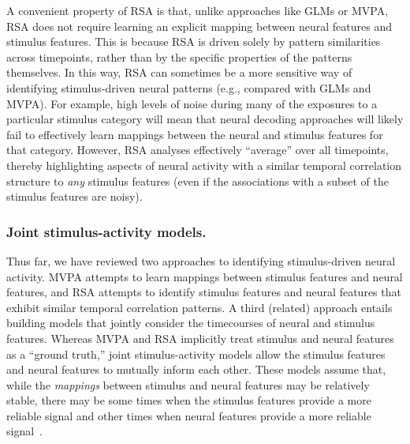 \documentclass{llmxive}
\begin{document}
A convenient property of RSA is that, unlike approaches like GLMs or
MVPA, RSA does not require learning an explicit mapping between neural
features and stimulus features.  This is because RSA is driven solely
by pattern similarities across timepoints, rather than by the specific
properties of the patterns themselves.  In this way, RSA can sometimes
be a more sensitive way of identifying stimulus-driven neural patterns
(e.g., compared with GLMs and MVPA).  For example, high levels of
noise during many of the exposures to a particular stimulus category
will mean that neural decoding approaches will likely fail to
effectively learn mappings between the neural and stimulus features
for that category.  However, RSA analyses effectively ``average'' over
all timepoints, thereby highlighting aspects of neural activity with a
similar temporal correlation structure to \textit{any} stimulus
features (even if the associations with a subset of the stimulus
features are noisy).

\subsubsection{Joint stimulus-activity models.}
Thus far, we have reviewed two approaches to identifying
stimulus-driven neural activity.  MVPA attempts to learn mappings
between stimulus features and neural features, and RSA attempts to
identify stimulus features and neural features that exhibit similar
temporal correlation patterns.  A third (related) approach entails
building models that jointly consider the timecourses of neural and
stimulus features.  Whereas MVPA and RSA implicitly treat stimulus and
neural features as a ``ground truth,'' joint stimulus-activity models
allow the stimulus features and neural features to mutually inform
each other.  These models assume that, while the \textit{mappings}
between stimulus and neural features may be relatively stable, there
may be some times when the stimulus features provide a more reliable
signal and other times when neural features provide a more reliable
signal~\citep{TurnEtal13}.
\end{document}
